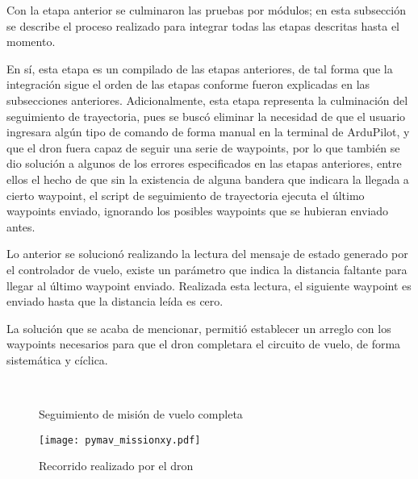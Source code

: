Con la etapa anterior se culminaron las pruebas por módulos; en esta subsección se describe el proceso realizado para integrar todas las etapas descritas hasta el momento.

En sí, esta etapa es un compilado de las etapas anteriores, de tal forma que la integración sigue el orden de las etapas conforme fueron explicadas en las subsecciones anteriores. Adicionalmente, esta etapa representa la culminación del seguimiento de trayectoria, pues se buscó eliminar la necesidad de que el usuario ingresara algún tipo de comando de forma manual en la terminal de ArduPilot, y que el dron fuera capaz de seguir una serie de waypoints, por lo que también se dio solución a algunos de los errores especificados en las etapas anteriores, entre ellos el hecho de que sin la existencia de alguna bandera que indicara la llegada a cierto waypoint, el script de seguimiento de trayectoria ejecuta el último waypoints enviado, ignorando los posibles waypoints que se hubieran enviado antes.

Lo anterior se solucionó realizando la lectura del mensaje de estado generado por el controlador de vuelo, existe un parámetro que indica la distancia faltante para llegar al último waypoint enviado. Realizada esta lectura, el siguiente waypoint es enviado hasta que la distancia leída es cero. 

La solución que se acaba de mencionar, permitió establecer un arreglo con los waypoints necesarios para que el dron completara el circuito de vuelo, de forma sistemática y cíclica.

\begin{figure}[ht]
    \centering
    \hfill
    \\
    \hfill
    \hfill

    \caption{Seguimiento de misión de vuelo completa}
    \label{fig:pymav_mission}
\end{figure}

\begin{figure}[ht]
    \centering
    \texttt{[image: pymav\_missionxy.pdf]}
    \caption{Recorrido realizado por el dron}
    \label{fig:pymav_missionxy}
\end{figure}

